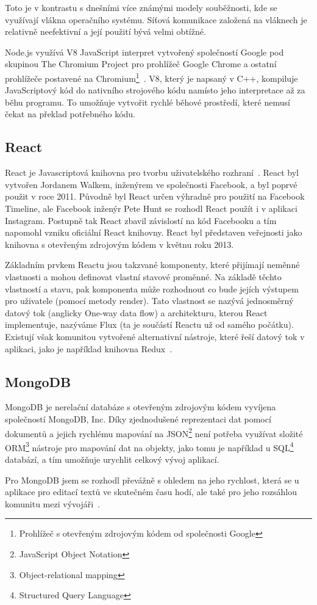Toto je v kontrastu s dnešními více známými modely souběžnosti, kde se využívají vlákna operačního systému.
Síťová komunikace založená na vláknech je relativně neefektivní a její použití bývá velmi obtížné.~\cite{node:about}

Node.js využívá V8 JavaScript interpret vytvořený společností Google pod skupinou The Chromium Project pro prohlížeč Google Chrome a ostatní prohlížeče postavené na Chromium\footnote{Prohlížeč s otevřeným zdrojovým kódem od společnosti Google}~\cite{node:es6}.
V8, který je napsaný v C++, kompiluje JavaScriptový kód do nativního strojového kódu namísto jeho interpretace až za běhu programu.
To umožňuje vytvořit rychlé běhové prostředí, které nemusí čekat na překlad potřebného kódu.~\cite{node:article2013}

\subsection{React}\label{subsec:reactjs}

React je Javascriptová knihovna pro tvorbu uživatelského rozhraní~\cite{react:about}.
React byl vytvořen Jordanem Walkem, inženýrem ve společnosti Facebook, a byl poprvé použit v roce 2011.
Původně byl React určen výhradně pro použití na Facebook Timeline, ale Facebook inženýr Pete Hunt se rozhodl React použít i v aplikaci Instagram.
Postupně tak React zbavil závislostí na kód Facebooku a tím napomohl vzniku oficiální React knihovny.
React byl představen veřejnosti jako knihovna s otevřeným zdrojovým kódem v květnu roku 2013.~\cite{react:author}

Základním prvkem Reactu jsou takzvané komponenty, které přijímají neměnné vlastnosti a mohou definovat vlastní stavové proměnné.
Na základě těchto vlastností a stavu, pak komponenta může rozhodnout co bude jejích výstupem pro uživatele (pomocí metody render).
Tato vlastnost se nazývá jednosměrný datový tok (anglicky One-way data flow) a architekturu, kterou React implementuje, nazýváme Flux (ta je součástí Reactu už od samého počátku).~\cite{react:about}
Existují však komunitou vytvořené alternativní nástroje, které řeší datový tok v aplikaci, jako je například knihovna Redux~\cite{react:redux}.

\subsection{MongoDB}\label{subsec:mongodb}
MongoDB je nerelační databáze s otevřeným zdrojovým kódem vyvíjena společností MongoDB, Inc.
Díky zjednodušené reprezentaci dat pomocí dokumentů a jejich rychlému mapování na JSON\footnote{JavaScript Object Notation} není potřeba využívat složité ORM\footnote{Object-relational mapping} nástroje pro mapování dat na objekty, jako tomu je například u SQL\footnote{Structured Query Language} databází, a tím umožňuje urychlit celkový vývoj aplikací.~\cite{mongo:about}

Pro MongoDB jsem se rozhodl převážně s ohledem na jeho rychlost, která se u aplikace pro editací textů ve skutečném času hodí, ale také pro jeho rozsáhlou komunitu mezi vývojáři~\cite{mongo:speed,mongo:popularity}.
